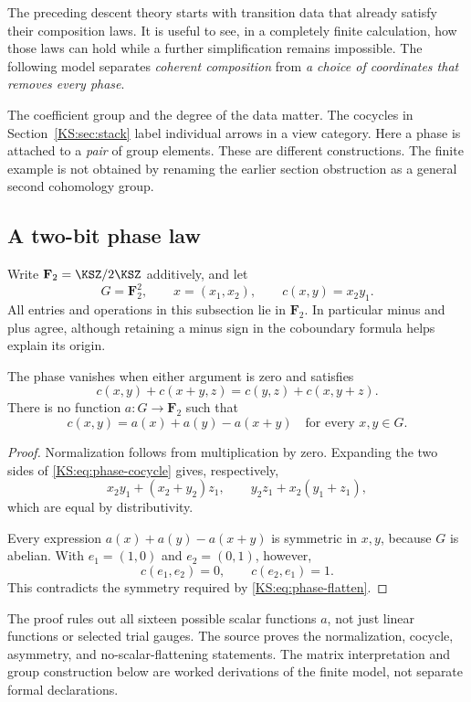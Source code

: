 \label{KS:sec:phase}
The preceding descent theory starts with transition data that already satisfy their composition laws. It is useful to see, in a completely finite calculation, how those laws can hold while a further simplification remains impossible. The following model separates \emph{coherent composition} from \emph{a choice of coordinates that removes every phase}.

The coefficient group and the degree of the data matter. The cocycles in Section~\ref{KS:sec:stack} label individual arrows in a view category. Here a phase is attached to a \emph{pair} of group elements. These are different constructions. The finite example is not obtained by renaming the earlier section obstruction as a general second cohomology group.

\subsection{A two-bit phase law}
Write \(\mathbf F_2=\KSZ/2\KSZ\) additively, and let
\[
 G=\mathbf F_2^2,\qquad x=(x_1,x_2),\qquad
 c(x,y)=x_2y_1.
\]
All entries and operations in this subsection lie in \(\mathbf F_2\). In particular minus and plus agree, although retaining a minus sign in the coboundary formula helps explain its origin.

\begin{KSproposition}\label{KS:KS80}
The phase vanishes when either argument is zero and satisfies
\begin{equation}\label{KS:eq:phase-cocycle}
 c(x,y)+c(x+y,z)=c(y,z)+c(x,y+z).
\end{equation}
There is no function \(a:G\to\mathbf F_2\) such that
\begin{equation}\label{KS:eq:phase-flatten}
 c(x,y)=a(x)+a(y)-a(x+y)\quad\text{for every }x,y\in G.
\end{equation}
\end{KSproposition}
\begin{proof}
Normalization follows from multiplication by zero. Expanding the two sides of \eqref{KS:eq:phase-cocycle} gives, respectively,
\[
 x_2y_1+(x_2+y_2)z_1,
 \qquad y_2z_1+x_2(y_1+z_1),
\]
which are equal by distributivity.

Every expression \(a(x)+a(y)-a(x+y)\) is symmetric in \(x,y\), because \(G\) is abelian. With \(e_1=(1,0)\) and \(e_2=(0,1)\), however,
\[
 c(e_1,e_2)=0,\qquad c(e_2,e_1)=1.
\]
This contradicts the symmetry required by \eqref{KS:eq:phase-flatten}.
\end{proof}
The proof rules out all sixteen possible scalar functions \(a\), not just linear functions or selected trial gauges. The source  proves the normalization, cocycle, asymmetry, and no-scalar-flattening statements. The matrix interpretation and group construction below are worked derivations of the finite model, not separate formal declarations.

